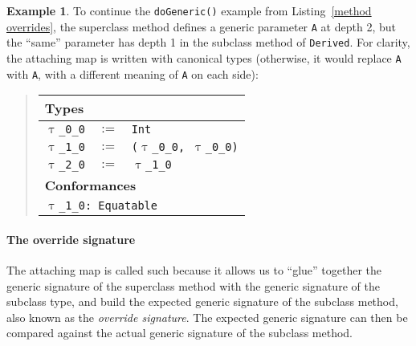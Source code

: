 \documentclass[a4paper,headsepline,bibliography=totoc,toc=flat,fleqn,twoside=semi]{scrbook}
\theoremstyle{definition}
\theoremstyle{definition}
\newtheorem{example}{Example}[chapter]
\theoremstyle{definition}
\newcommand{\ttgp}[2]{\texttt{$\uptau$\_#1\_#2}}
\newcommand{\SubMapC}[2]{\begin{tabular}{|lll|}
\hline
\multicolumn{3}{|l|}{\textbf{Types}}\\
\hline
#1\\
\hline
\hline
\multicolumn{3}{|l|}{\textbf{Conformances}}\\
\hline
#2\\
\hline
\end{tabular}}
\newcommand{\SubType}[2]{\texttt{#1}&$:=$&\texttt{#2}}
\newcommand{\SubConf}[1]{\multicolumn{3}{|l|}{\texttt{#1}}}
\begin{document}
\begin{example}
To continue the \texttt{doGeneric()} example from Listing~\ref{method overrides}, the superclass method defines a generic parameter \texttt{A} at depth 2, but the ``same'' parameter has depth 1 in the subclass method of \texttt{Derived}. For clarity, the attaching map is written with canonical types (otherwise, it would replace \texttt{A} with \texttt{A}, with a different meaning of \texttt{A} on each side):
\begin{quote}
\SubMapC{
\SubType{\ttgp{0}{0}}{Int}\\
\SubType{\ttgp{1}{0}}{(\ttgp{0}{0}, \ttgp{0}{0})}\\
\SubType{\ttgp{2}{0}}{\ttgp{1}{0}}
}{
\SubConf{\ttgp{1}{0}:\ Equatable}
}
\end{quote}
\end{example}

\paragraph{The override signature}
The attaching map is called such because it allows us to ``glue'' together the generic signature of the superclass method with the generic signature of the subclass type, and build the expected generic signature of the subclass method, also known as the \emph{override signature}. The expected generic signature can then be compared against the actual generic signature of the subclass method.
\end{document}
